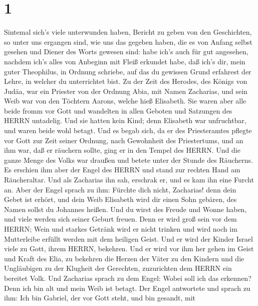 \hypertarget{section}{%
\section{1}\label{section}}

 Sintemal sich's viele unterwunden haben, Bericht zu geben
von den Geschichten, so unter uns ergangen sind,  wie uns
das gegeben haben, die es von Anfang selbst gesehen und Diener des Worts
gewesen sind:  habe ich's auch für gut angesehen, nachdem
ich's alles von Anbeginn mit Fleiß erkundet habe, daß ich's dir, mein
guter Theophilus, in Ordnung schriebe,  auf das du gewissen
Grund erfahrest der Lehre, in welcher du unterrichtet bist. 
Zu der Zeit des Herodes, des Königs von Judäa, war ein Priester von der
Ordnung Abia, mit Namen Zacharias, und sein Weib war von den Töchtern
Aarons, welche hieß Elisabeth.  Sie waren aber alle beide
fromm vor Gott und wandelten in allen Geboten und Satzungen des HERRN
untadelig.  Und sie hatten kein Kind; denn Elisabeth war
unfruchtbar, und waren beide wohl betagt.  Und es begab
sich, da er des Priesteramtes pflegte vor Gott zur Zeit seiner Ordnung,
 nach Gewohnheit des Priestertums, und an ihm war, daß er
räuchern sollte, ging er in den Tempel des HERRN.  Und die
ganze Menge des Volks war draußen und betete unter der Stunde des
Räucherns.  Es erschien ihm aber der Engel des HERRN und
stand zur rechten Hand am Räucheraltar.  Und als Zacharias
ihn sah, erschrak er, und es kam ihn eine Furcht an.  Aber
der Engel sprach zu ihm: Fürchte dich nicht, Zacharias! denn dein Gebet
ist erhört, und dein Weib Elisabeth wird dir einen Sohn gebären, des
Namen sollst du Johannes heißen.  Und du wirst des Freude
und Wonne haben, und viele werden sich seiner Geburt freuen.
 Denn er wird groß sein vor dem HERRN; Wein und starkes
Getränk wird er nicht trinken und wird noch im Mutterleibe erfüllt
werden mit dem heiligen Geist.  Und er wird der Kinder
Israel viele zu Gott, ihrem HERRN, bekehren.  Und er wird
vor ihm her gehen im Geist und Kraft des Elia, zu bekehren die Herzen
der Väter zu den Kindern und die Ungläubigen zu der Klugheit der
Gerechten, zuzurichten dem HERRN ein bereitet Volk.  Und
Zacharias sprach zu dem Engel: Wobei soll ich das erkennen? Denn ich bin
alt und mein Weib ist betagt.  Der Engel antwortete und
sprach zu ihm: Ich bin Gabriel, der vor Gott steht, und bin gesandt, mit
